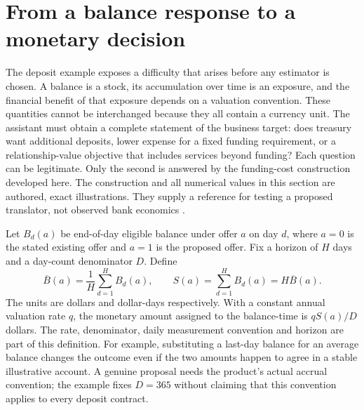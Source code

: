 \section{From a balance response to a monetary decision}
\label{exec17:l2-monetary}

The deposit example exposes a difficulty that arises before any estimator is
chosen. A balance is a stock, its accumulation over time is an exposure, and
the financial benefit of that exposure depends on a valuation convention.
These quantities cannot be interchanged because they all contain a currency
unit. The assistant must obtain a complete statement of the business target:
does treasury want additional deposits, lower expense for a fixed funding
requirement, or a relationship-value objective that includes services beyond
funding? Each question can be legitimate. Only the second is answered by the
funding-cost construction developed here. The construction and all numerical
values in this section are authored, exact illustrations. They supply a
reference for testing a proposed translator, not observed bank economics
\citep{exec17_l2_monetary_exact}.

Let $B_d(a)$ be end-of-day eligible balance under offer $a$ on day $d$, where
$a=0$ is the stated existing offer and $a=1$ is the proposed offer. Fix a
horizon of $H$ days and a day-count denominator $D$. Define
\begin{equation}
 \overline B(a)=\frac1H\sum_{d=1}^H B_d(a),\qquad
 S(a)=\sum_{d=1}^H B_d(a)=H\overline B(a).
 \label{exec17:l2-stock}
\end{equation}
The units are dollars and dollar-days respectively. With a constant annual
valuation rate $q$, the monetary amount assigned to the balance-time is
$qS(a)/D$ dollars. The rate, denominator, daily measurement convention and
horizon are part of this definition. For example, substituting a last-day
balance for an average balance changes the outcome even if the two amounts
happen to agree in a stable illustrative account. A genuine proposal needs
the product's actual accrual convention; the example fixes $D=365$ without
claiming that this convention applies to every deposit contract.


